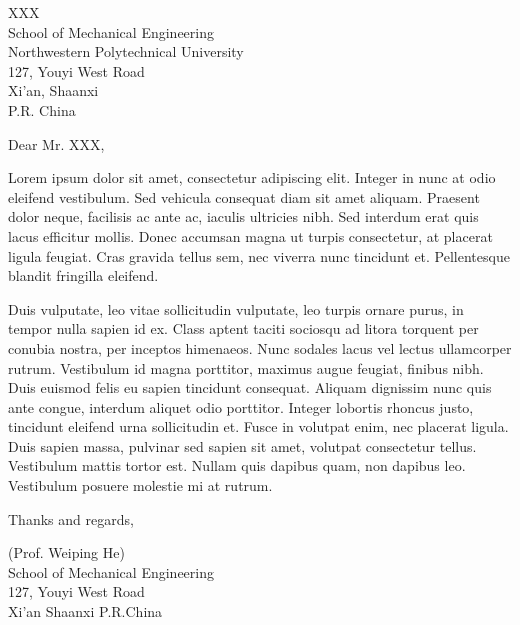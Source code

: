 \documentclass[12pt, a4paper]{letter} %
\begin{document}

\begin{letter}{
	XXX\\
	School of Mechanical Engineering\\
	Northwestern Polytechnical University\\
	127, Youyi West Road\\
	Xi'an, Shaanxi\\
	P.R. China\\
}



\opening{Dear Mr. XXX,}

Lorem ipsum dolor sit amet, consectetur adipiscing elit. Integer in nunc at odio eleifend vestibulum. Sed vehicula consequat diam sit amet aliquam. Praesent dolor neque, facilisis ac ante ac, iaculis ultricies nibh. Sed interdum erat quis lacus efficitur mollis. Donec accumsan magna ut turpis consectetur, at placerat ligula feugiat. Cras gravida tellus sem, nec viverra nunc tincidunt et. Pellentesque blandit fringilla eleifend.

Duis vulputate, leo vitae sollicitudin vulputate, leo turpis ornare purus, in tempor nulla sapien id ex. Class aptent taciti sociosqu ad litora torquent per conubia nostra, per inceptos himenaeos. Nunc sodales lacus vel lectus ullamcorper rutrum. Vestibulum id magna porttitor, maximus augue feugiat, finibus nibh. Duis euismod felis eu sapien tincidunt consequat. Aliquam dignissim nunc quis ante congue, interdum aliquet odio porttitor. Integer lobortis rhoncus justo, tincidunt eleifend urna sollicitudin et. Fusce in volutpat enim, nec placerat ligula. Duis sapien massa, pulvinar sed sapien sit amet, volutpat consectetur tellus. Vestibulum mattis tortor est. Nullam quis dapibus quam, non dapibus leo. Vestibulum posuere molestie mi at rutrum.

\closing{Thanks and regards,}

\signature{XXX}

\noindent
(Prof. Weiping He)\\
School of Mechanical Engineering\\ %
127, Youyi West Road\\ %
Xi'an Shaanxi P.R.China\\ %




\end{letter}
\end{document}
